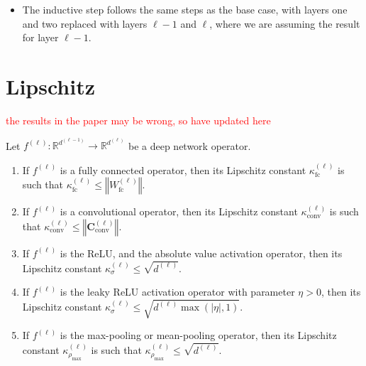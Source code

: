\begin{tproof}
\begin{itemize}
\begin{align*}
        \end{align*}
        where $A^{(1,2)}\in\mathbb{R}^{1\times r^{(2)}r^{(1)}\times d}$ and $B^{(1,2)}\in\mathbb{R}^{r^{(2)}r^{(1)}}$ with $$\begin{cases}\left[A^{(1,2)}\right]_{1,j,\cdot}=\sum_{i=1}^{d^{(\ell)}}\left[A^{(2)}\right]_{1,p+1,i}\left[A^{(1)}\right]_{i,q,\cdot}&j=pr^{(1)}+q\text{ for }p=0,\dots,r^{(2)}-1\text{ and }q\in\left\{1,\dots,r^{(1)}\right\}\\\left[B^{(1,2)}\right]=\left[B^{(2)}\right]_q+\sum_{i=1}^{d^{(\ell)}}\left[B^{(1)}\right]_{i,p}&j=pr^{(1)}+q\text{ for }p=0,\dots,r^{(2)}-1\text{ and }q\in\left\{1,\dots,r^{(1)}\right\}.\end{cases}$$In $(1)$ we have used the non-decreasing property of the second layer to infer $\left[A^{(2)}\right]_{1,j^\prime,i}\geq0$ by Proposition \ref{prop:non_decreasing_property}, allowing us to move it into the maximum operation.
        \item The inductive step follows the same steps as the base case, with layers one and two replaced with layers $\ell-1$ and $\ell$, where we are assuming the result for layer $\ell-1$.
    \end{itemize}
\end{tproof}

\section{Lipschitz}\label{sec:lipschitz}

\textcolor{Red}{the results in the paper may be wrong, so have updated here}

\begin{proposition}\label{prop:deep_network_operator_lipschitz_constants}
    Let $f^{(\ell)}:\mathbb{R}^{d^{(\ell-1)}}\to\mathbb{R}^{d^{(\ell)}}$ be a deep network operator.
    \begin{enumerate}
        \item If $f^{(\ell)}$ is a fully connected operator, then its Lipschitz constant $\kappa^{(\ell)}_{\text{fc}}$ is such that $\kappa^{(\ell)}_{\text{fc}}\leq\left\Vert W^{(\ell)}_{\text{fc}}\right\Vert$.
        \item If $f^{(\ell)}$ is a convolutional operator, then its Lipschitz constant $\kappa^{(\ell)}_{\text{conv}}$ is such that $\kappa^{(\ell)}_{\text{conv}}\leq\left\Vert\mathbf{C}^{(\ell)}_{\text{conv}}\right\Vert.$
        \item If $f^{(\ell)}$ is the ReLU, and the absolute value activation operator, then its Lipschitz constant $\kappa^{(\ell)}_{\sigma}\leq\sqrt{d^{(\ell)}}$.
        \item If $f^{(\ell)}$ is the leaky ReLU activation operator with parameter $\eta>0$, then its Lipschitz constant $\kappa^{(\ell)}_{\sigma}\leq\sqrt{d^{(\ell)}\max\left(\vert\eta\vert,1\right)}$.
        \item If $f^{(\ell)}$ is the max-pooling or mean-pooling operator, then its Lipschitz constant $\kappa^{(\ell)}_{\rho_{\max}}$ is such that $\kappa^{(\ell)}_{\rho_{\max}}\leq\sqrt{d^{(\ell)}}$.
    \end{enumerate}
\end{proposition}

